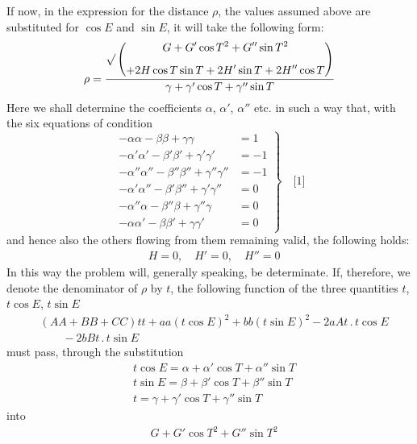 \begingroup
\renewcommand{\arraystretch}{1.45}

If now, in the expression for the distance $\rho$, the values assumed above are substituted for $\cos E$ and $\sin E$, it will take the following form:
\[
\rho=\frac{\surd\left(\begin{gathered}G+G'\cos T^2+G''\sin T^2\\[5pt]
+2H\cos T\sin T+2H'\sin T+2H''\cos T\end{gathered}\right)}{\gamma+\gamma'\cos T+\gamma''\sin T}
\]
Here we shall determine the coefficients $\alpha$, $\alpha'$, $\alpha''$ etc. in such a way that, with the six equations of condition
\[
\left.\begin{aligned}
-\alpha\alpha-\beta\beta+\gamma\gamma&=1\\[5pt]
-\alpha'\alpha'-\beta'\beta'+\gamma'\gamma'&=-1\\[5pt]
-\alpha''\alpha''-\beta''\beta''+\gamma''\gamma''&=-1\\[5pt]
-\alpha'\alpha''-\beta'\beta''+\gamma'\gamma''&=0\\[5pt]
-\alpha''\alpha-\beta''\beta+\gamma''\gamma&=0\\[5pt]
-\alpha\alpha'-\beta\beta'+\gamma\gamma'&=0
\end{aligned}\right\}\quad\text{[1]}
\]
and hence also the others flowing from them remaining valid, the following holds:
\[
\begin{aligned}
&H=0,\quad H'=0,\quad H''=0
\end{aligned}
\]
In this way the problem will, generally speaking, be determinate. If, therefore, we denote the denominator of $\rho$ by $t$, the following function of the three quantities $t$, $t\cos E$, $t\sin E$
\[
\begin{aligned}
&(AA+BB+CC)tt+aa(t\cos E)^2+bb(t\sin E)^2-2aAt\, .\, t\cos E\\[6pt]
&\qquad{}-2bBt\, .\, t\sin E
\end{aligned}
\]
must pass, through the substitution
\[
\begin{aligned}
&t\cos E=\alpha+\alpha'\cos T+\alpha''\sin T\\[6pt]
&t\sin E=\beta+\beta'\cos T+\beta''\sin T\\[6pt]
&t=\gamma+\gamma'\cos T+\gamma''\sin T
\end{aligned}
\]
into
\[
\begin{aligned}
&G+G'\cos T^2+G''\sin T^2
\end{aligned}
\]
